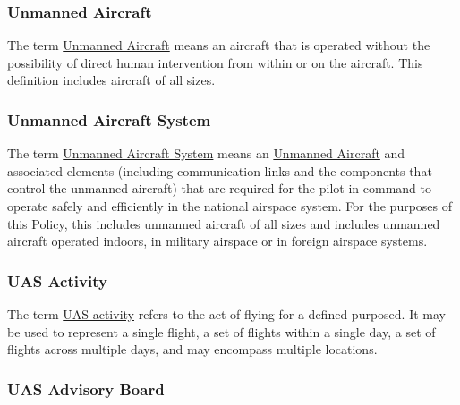 \documentclass[
]{book}
\begin{document}
\hypertarget{UA}{%
\subsubsection*{Unmanned Aircraft}\label{UA}}

The term \protect\hyperlink{UA}{Unmanned Aircraft} means an aircraft that is operated without the possibility of direct human intervention from within or on the aircraft. This definition includes aircraft of all sizes.





\hypertarget{UAS}{%
\subsubsection*{Unmanned Aircraft System}\label{UAS}}

The term \protect\hyperlink{UAS}{Unmanned Aircraft System} means an \protect\hyperlink{UA}{Unmanned Aircraft} and associated elements (including communication links and the components that control the unmanned aircraft) that are required for the pilot in command to operate safely and efficiently in the national airspace system. For the purposes of this Policy, this includes unmanned aircraft of all sizes and includes unmanned aircraft operated indoors, in military airspace or in foreign airspace systems.







\hypertarget{UASactivity}{%
\subsubsection*{UAS Activity}\label{UASactivity}}

The term \protect\hyperlink{UASactivity}{UAS activity} refers to the act of flying for a defined purposed. It may be used to represent a single flight, a set of flights within a single day, a set of flights across multiple days, and may encompass multiple locations.



\hypertarget{AB}{%
\subsubsection*{UAS Advisory Board}\label{AB}}
\end{document}
